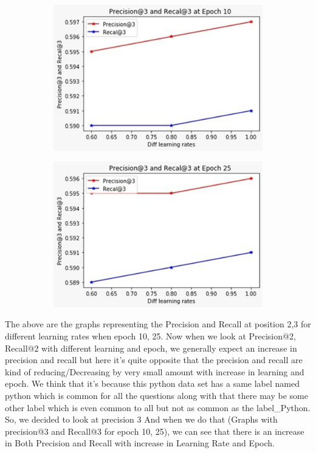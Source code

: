 \documentclass[a4paper,1pt]{article}
\begin{document}
\begin{figure}[h!]
	
	\centering
	\begin{subfigure}[b]{0.4\linewidth}
		\includegraphics[width=1.0\linewidth]{"screenshot005"}
	 
	\end{subfigure}
	\begin{subfigure}[b]{0.4\linewidth}
		\includegraphics[width=1.0\linewidth]{"screenshot006"}
		
	\end{subfigure}
\end{figure}


The above are the graphs representing the Precision and Recall at position 2,3 for different learning rates when epoch 10, 25. 
Now when we look at Precision@2, Recall@2 with different learning and epoch, we generally expect an increase in precision and recall but here it’s quite opposite that the precision and recall are kind of reducing/Decreasing by very small amount with increase in learning and epoch. We think that it’s because this python data set has a same label named python which is common for all the questions along with that there may be some other label which is even common to all but not as common as the label\_Python. So, we decided to look at precision 3
And when we do that (Graphs with precision@3 and Recall@3 for epoch 10, 25), we can see that there is an increase in Both Precision and Recall with increase in Learning Rate and Epoch.
\end{document}
